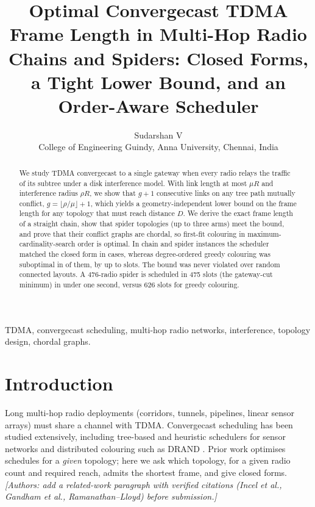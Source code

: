 \IfFileExists{IEEEtran.cls}{\documentclass[journal]{IEEEtran}}{\documentclass[10pt,twocolumn]{article}\usepackage[margin=0.75in]{geometry}\newcommand{\IEEEkeywords}{\textbf{Index Terms---}}}
\begin{document}
\title{Optimal Convergecast TDMA Frame Length in Multi-Hop Radio Chains and Spiders: Closed Forms, a Tight Lower Bound, and an Order-Aware Scheduler}
\author{Sudarshan V\\College of Engineering Guindy, Anna University, Chennai, India}
\maketitle
\begin{abstract}
We study TDMA convergecast to a single gateway when every radio relays the traffic of its subtree under a disk interference model. With link length at most $\mu R$ and interference radius $\rho R$, we show that $g+1$ consecutive links on any tree path mutually conflict, $g=\lfloor\rho/\mu\rfloor+1$, which yields a geometry-independent lower bound on the frame length for any topology that must reach distance $D$. We derive the exact frame length of a straight chain, show that spider topologies (up to three arms) meet the bound, and prove that their conflict graphs are chordal, so first-fit colouring in maximum-cardinality-search order is optimal. In \theoryCases{} chain and spider instances the scheduler matched the closed form in \theoryExact{} cases, whereas degree-ordered greedy colouring was suboptimal in \greedySub{} of them, by up to \worstExcess{} slots. The bound was never violated over \boundTrials{} random connected layouts. A 476-radio spider is scheduled in 475 slots (the gateway-cut minimum) in under one second, versus 626 slots for greedy colouring.
\end{abstract}
\begin{IEEEkeywords}TDMA, convergecast scheduling, multi-hop radio networks, interference, topology design, chordal graphs.\end{IEEEkeywords}

\section{Introduction}
Long multi-hop radio deployments (corridors, tunnels, pipelines, linear sensor arrays) must share a channel with TDMA. Convergecast scheduling has been studied extensively, including tree-based and heuristic schedulers for sensor networks and distributed colouring such as DRAND \cite{rhee2009}. Prior work optimises schedules for a \emph{given} topology; here we ask which topology, for a given radio count and required reach, admits the shortest frame, and give closed forms. \emph{[Authors: add a related-work paragraph with verified citations (Incel et al., Gandham et al., Ramanathan--Lloyd) before submission.]}
\end{document}

